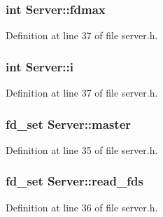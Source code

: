 \subsubsection[{\texorpdfstring{fdmax}{fdmax}}]{\setlength{\rightskip}{0pt plus 5cm}int Server\+::fdmax\hspace{0.3cm}{\ttfamily [private]}}\hypertarget{class_server_ad99b9998fb160ed17033e1e1e9032440}{}\label{class_server_ad99b9998fb160ed17033e1e1e9032440}


Definition at line 37 of file server.\+h.

\subsubsection[{\texorpdfstring{i}{i}}]{\setlength{\rightskip}{0pt plus 5cm}int Server\+::i\hspace{0.3cm}{\ttfamily [private]}}\hypertarget{class_server_a2792b877f5f7dbccbcb0ebe508ba8bf4}{}\label{class_server_a2792b877f5f7dbccbcb0ebe508ba8bf4}


Definition at line 37 of file server.\+h.

\subsubsection[{\texorpdfstring{master}{master}}]{\setlength{\rightskip}{0pt plus 5cm}fd\+\_\+set Server\+::master\hspace{0.3cm}{\ttfamily [private]}}\hypertarget{class_server_a19d11be457efea552874f318a14ac808}{}\label{class_server_a19d11be457efea552874f318a14ac808}


Definition at line 35 of file server.\+h.

\subsubsection[{\texorpdfstring{read\+\_\+fds}{read_fds}}]{\setlength{\rightskip}{0pt plus 5cm}fd\+\_\+set Server\+::read\+\_\+fds\hspace{0.3cm}{\ttfamily [private]}}\hypertarget{class_server_a06e809efd5707f6a10935790c5978eb7}{}\label{class_server_a06e809efd5707f6a10935790c5978eb7}


Definition at line 36 of file server.\+h.

